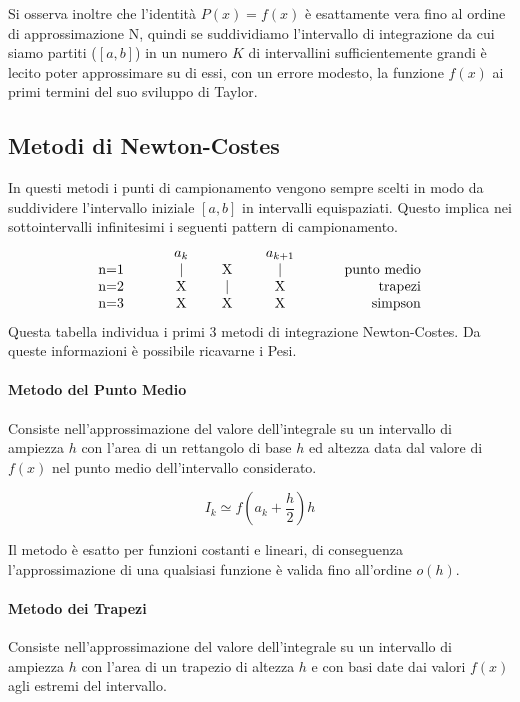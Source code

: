 \documentclass{article}
\begin{document}
Si osserva inoltre che l'identità $P(x)=f(x)$ è esattamente vera fino al ordine di approssimazione N, quindi se suddividiamo l'intervallo di integrazione da cui siamo partiti ($[a,b]$) in un numero $K$ di intervallini sufficientemente grandi è lecito poter approssimare su di essi, con un errore modesto, la funzione $f(x)$ ai primi termini del suo sviluppo di Taylor.

\subsection{Metodi di Newton-Costes}
In questi metodi i punti di campionamento vengono sempre scelti in modo da suddividere l'intervallo iniziale $[a,b]$ in intervalli equispaziati. Questo implica nei sottointervalli infinitesimi i seguenti pattern di campionamento.
	\begin{displaymath}
		\begin{tabular}{lcccccccccr}
			&   & & $a_{k}$ & & & &$a_{k+1}$ &  &   &\\
			n=1 & &   & $\mid$ & & X & & $\mid$ & &   &\textrm{punto medio}\\
			n=2 & &   & X & & $\mid$ & & X & &   &\textrm{trapezi}\\
			n=3 & &   & X & & X & & X & &   &\textrm{simpson}\\
		\end{tabular} 
	\end{displaymath}
Questa tabella individua i primi 3 metodi di integrazione Newton-Costes. Da queste informazioni è possibile ricavarne i Pesi.

\paragraph{Metodo del Punto Medio}

Consiste nell'approssimazione del valore dell'integrale su un intervallo di ampiezza $h$ con l'area di un rettangolo di base $h$ ed altezza data dal valore di $f(x)$ nel punto medio dell'intervallo considerato.

	\begin{equation}
	I_{k}\simeq f(a_{k}+\frac{h}{2})h
	\end{equation}

Il metodo è esatto per funzioni costanti e lineari, di conseguenza l'approssimazione di una qualsiasi funzione è valida fino all'ordine $o(h)$.


\paragraph{Metodo dei Trapezi}
Consiste nell'approssimazione del valore dell'integrale su un intervallo di ampiezza $h$ con l'area di un trapezio di altezza $h$ e con basi date dai valori $f(x)$ agli estremi del intervallo.
\end{document}
